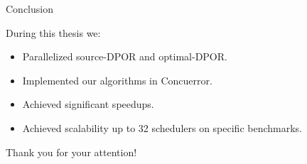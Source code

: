 \documentclass[9pt]{beamer}
\begin{document}
\begin{frame}{Conclusion}

During this thesis we:
\begin{itemize}[<+->]
\item Parallelized source-DPOR and optimal-DPOR.
\item Implemented our algorithms in Concuerror.
\item Achieved significant speedups.
\item Achieved scalability up to 32 schedulers on specific benchmarks.
\end{itemize}

\end{frame}




\begin{frame}{}

Thank you for your attention!

\end{frame}
\end{document}
